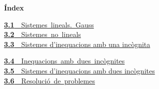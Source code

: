 \documentclass[11pt,a4paper]{article}
\begin{document}
\begin{tcolorbox}[colback=fmsurface,colframe=fmsurface,arc=3mm,left=4mm,right=4mm,top=2mm,bottom=2mm]
\small\textbf{Índex}\par\smallskip
\begin{minipage}[t]{0.49\linewidth}\small \mbox{\hyperlink{sec1}{\textbf{\color{fmgreen}3.1}\ \ Sistemes lineals. Gauss}}\\[3pt]
\mbox{\hyperlink{sec2}{\textbf{\color{fmgreen}3.2}\ \ Sistemes no lineals}}\\[3pt]
\hyperlink{sec3}{\textbf{\color{fmgreen}3.3}\ \ Sistemes d'inequacions amb una incògnita}\\[3pt]\end{minipage}\hfill\begin{minipage}[t]{0.49\linewidth}\small \mbox{\hyperlink{sec4}{\textbf{\color{fmgreen}3.4}\ \ Inequacions amb dues incògnites}}\\[3pt]
\hyperlink{sec5}{\textbf{\color{fmgreen}3.5}\ \ Sistemes d'inequacions amb dues incògnites}\\[3pt]
\mbox{\hyperlink{sec6}{\textbf{\color{fmgreen}3.6}\ \ Resolució de problemes}}\\[3pt]\end{minipage}
\end{tcolorbox}

\end{document}

